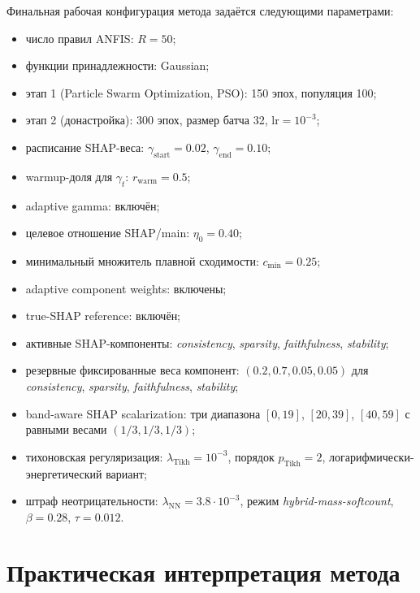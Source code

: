 \documentclass[11pt]{article}
\begin{document}
Финальная рабочая конфигурация метода задаётся следующими параметрами:
\begin{itemize}
    \item число правил ANFIS: $R=50$;
    \item функции принадлежности: Gaussian;
    \item этап 1 (Particle Swarm Optimization, PSO): 150 эпох, популяция 100;
    \item этап 2 (донастройка): 300 эпох, размер батча 32, $\mathrm{lr}=10^{-3}$;
    \item расписание SHAP-веса: $\gamma_{\mathrm{start}}=0.02$, $\gamma_{\mathrm{end}}=0.10$;
    \item warmup-доля для $\gamma_t$: $r_{\mathrm{warm}}=0.5$;
    \item adaptive gamma: включён;
    \item целевое отношение SHAP/main: $\eta_0=0.40$;
    \item минимальный множитель плавной сходимости: $c_{\min}=0.25$;
    \item adaptive component weights: включены;
    \item true-SHAP reference: включён;
    \item активные SHAP-компоненты: \textit{consistency}, \textit{sparsity}, \textit{faithfulness}, \textit{stability};
    \item резервные фиксированные веса компонент: $(0.2, 0.7, 0.05, 0.05)$ для \textit{consistency}, \textit{sparsity}, \textit{faithfulness}, \textit{stability};
    \item band-aware SHAP scalarization: три диапазона $[0,19]$, $[20,39]$, $[40,59]$ с равными весами $(1/3,1/3,1/3)$;
    \item тихоновская регуляризация: $\lambda_{\mathrm{Tikh}}=10^{-3}$, порядок $p_{\mathrm{Tikh}}=2$, логарифмически-энергетический вариант;
    \item штраф неотрицательности: $\lambda_{\mathrm{NN}}=3.8\cdot 10^{-3}$, режим \textit{hybrid-mass-softcount}, $\beta=0.28$, $\tau=0.012$.
\end{itemize}

\section{Практическая интерпретация метода}
\end{document}
